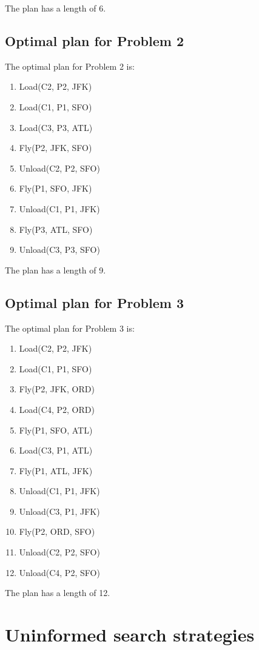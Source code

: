 \documentclass[11pt]{article}
\begin{document}
The plan has a length of 6.

\subsection{Optimal plan for Problem 2}

The optimal plan for Problem 2 is:

\begin{enumerate}
  \item Load(C2, P2, JFK)
  \item Load(C1, P1, SFO)
  \item Load(C3, P3, ATL)
  \item Fly(P2, JFK, SFO)
  \item Unload(C2, P2, SFO)
  \item Fly(P1, SFO, JFK)
  \item Unload(C1, P1, JFK)
  \item Fly(P3, ATL, SFO)
  \item Unload(C3, P3, SFO)
\end{enumerate}

The plan has a length of 9.

\subsection{Optimal plan for Problem 3}

The optimal plan for Problem 3 is:

\begin{enumerate}
  \item Load(C2, P2, JFK)
  \item Load(C1, P1, SFO)
  \item Fly(P2, JFK, ORD)
  \item Load(C4, P2, ORD)
  \item Fly(P1, SFO, ATL)
  \item Load(C3, P1, ATL)
  \item Fly(P1, ATL, JFK)
  \item Unload(C1, P1, JFK)
  \item Unload(C3, P1, JFK)
  \item Fly(P2, ORD, SFO)
  \item Unload(C2, P2, SFO)
  \item Unload(C4, P2, SFO)
\end{enumerate}

The plan has a length of 12.

\section{Uninformed search strategies}
\end{document}
